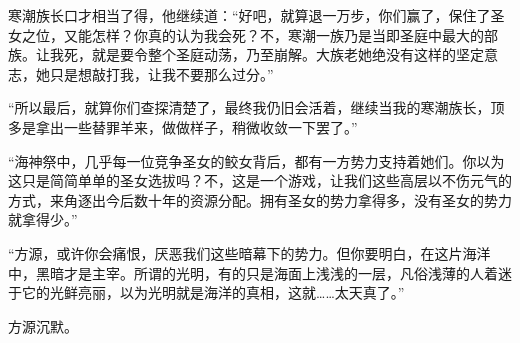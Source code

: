\begin{this_body}
寒潮族长口才相当了得，他继续道：“好吧，就算退一万步，你们赢了，保住了圣女之位，又能怎样？你真的认为我会死？不，寒潮一族乃是当即圣庭中最大的部族。让我死，就是要令整个圣庭动荡，乃至崩解。大族老她绝没有这样的坚定意志，她只是想敲打我，让我不要那么过分。”

“所以最后，就算你们查探清楚了，最终我仍旧会活着，继续当我的寒潮族长，顶多是拿出一些替罪羊来，做做样子，稍微收敛一下罢了。”

“海神祭中，几乎每一位竞争圣女的鲛女背后，都有一方势力支持着她们。你以为这只是简简单单的圣女选拔吗？不，这是一个游戏，让我们这些高层以不伤元气的方式，来角逐出今后数十年的资源分配。拥有圣女的势力拿得多，没有圣女的势力就拿得少。”

“方源，或许你会痛恨，厌恶我们这些暗幕下的势力。但你要明白，在这片海洋中，黑暗才是主宰。所谓的光明，有的只是海面上浅浅的一层，凡俗浅薄的人着迷于它的光鲜亮丽，以为光明就是海洋的真相，这就……太天真了。”

方源沉默。

\end{this_body}

